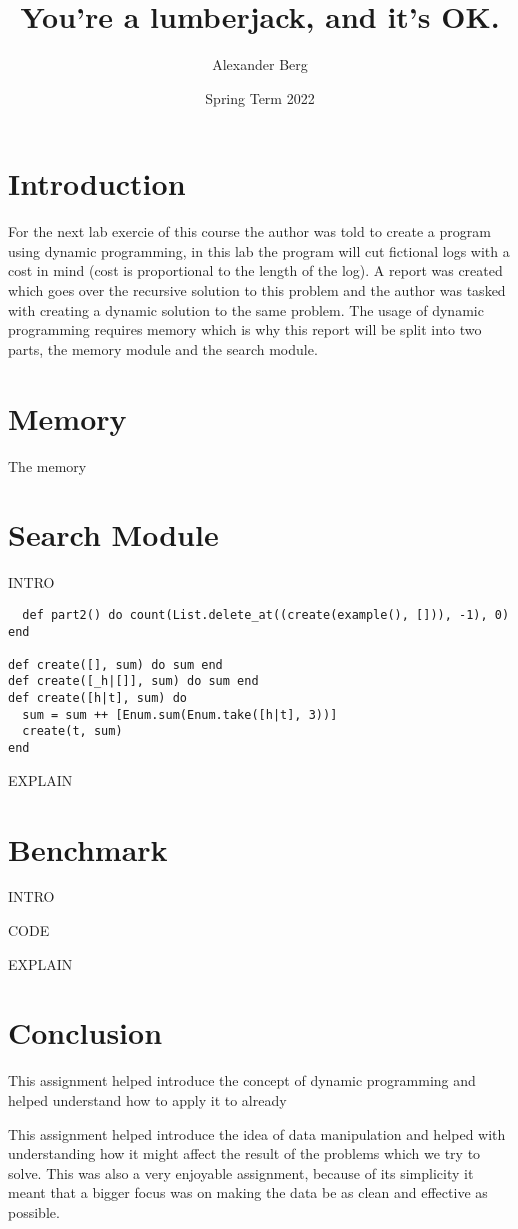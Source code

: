 \documentclass[a4paper,11pt]{article}
\begin{document}
\title{
    \textbf{You're a lumberjack, and it's OK.}
}
\author{Alexander Berg}
\date{Spring Term 2022}

\maketitle

\section*{Introduction}


For the next lab exercie of this course the author was told to create a program using dynamic programming, in this lab the program will cut fictional logs with a cost in mind (cost is proportional to the length of the log). A report was created which goes over the recursive solution to this problem and the author was tasked with creating a dynamic solution to the same problem. The usage of dynamic programming requires memory which is why this report will be split into two parts, the memory module and the search module.

\section*{Memory}

The memory

\section*{Search Module}

INTRO

\begin{verbatim}
  def part2() do count(List.delete_at((create(example(), [])), -1), 0) end

def create([], sum) do sum end
def create([_h|[]], sum) do sum end
def create([h|t], sum) do
  sum = sum ++ [Enum.sum(Enum.take([h|t], 3))]
  create(t, sum)
end
\end{verbatim}

EXPLAIN

\section*{Benchmark}

INTRO

CODE

EXPLAIN

\section*{Conclusion}

This assignment helped introduce the concept of dynamic programming and helped understand how to apply it to already 

This assignment helped introduce the idea of data manipulation and helped with understanding how it might affect the result of the problems which we try to solve. This was also a very enjoyable assignment, because of its simplicity it meant that a bigger focus was on making the data be as clean and effective as possible.
\end{document}
